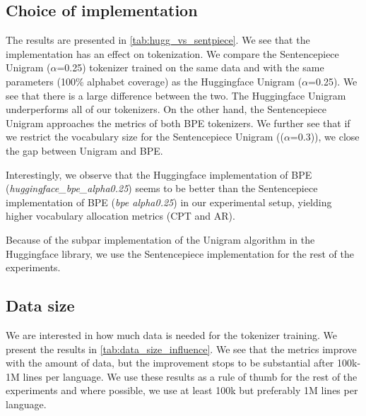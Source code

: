 \subsection{Choice of implementation}
\label{sec:implementation}



The results are presented in \autoref{tab:hugg_vs_sentpiece}. We see that the implementation has an effect on tokenization. We compare the Sentencepiece Unigram ($\alpha$=0.25) tokenizer trained on the same data and with the same parameters (100\% alphabet coverage) as the Huggingface Unigram ($\alpha$=0.25). We see that there is a large difference between the two. The Huggingface Unigram underperforms all of our tokenizers. On the other hand, the Sentencepiece Unigram approaches the metrics of both BPE tokenizers. We further see that if we restrict the vocabulary size for the Sentencepiece Unigram (($\alpha$=0.3)), we close the gap between Unigram and BPE. 

Interestingly, we observe that the Huggingface implementation of BPE (\textit{huggingface\_bpe\_alpha0.25}) seems to be better than the Sentencepiece implementation of BPE (\textit{bpe alpha0.25}) in our experimental setup, yielding higher vocabulary allocation metrics (CPT and AR).

Because of the subpar implementation of the Unigram algorithm in the Huggingface library, we use the Sentencepiece implementation for the rest of the experiments.

\subsection{Data size}
\label{sec:data_size}



We are interested in how much data is needed for the tokenizer training. We present the results in \autoref{tab:data_size_influence}. We see that the metrics improve with the amount of data, but the improvement stops to be substantial after 100k-1M lines per language. We use these results as a rule of thumb for the rest of the experiments and where possible, we use at least 100k but preferably 1M lines per language.

